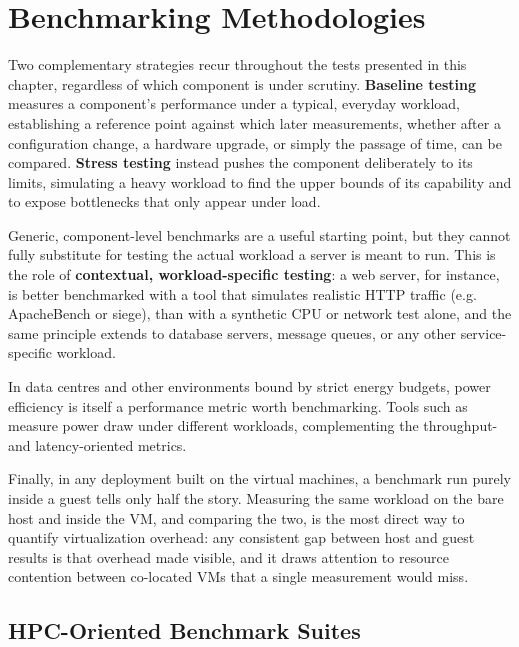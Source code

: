 \section{Benchmarking Methodologies} \label{sec:benchmark_methodology}

Two complementary strategies recur throughout the tests presented in this chapter, regardless of which component is under scrutiny. \textbf{Baseline testing} measures a component's performance under a typical, everyday workload, establishing a reference point against which later measurements, whether after a configuration change, a hardware upgrade, or simply the passage of time, can be compared. \textbf{Stress testing} instead pushes the component deliberately to its limits, simulating a heavy workload to find the upper bounds of its capability and to expose bottlenecks that only appear under load.

Generic, component-level benchmarks are a useful starting point, but they cannot fully substitute for testing the actual workload a server is meant to run. This is the role of \textbf{contextual, workload-specific testing}: a web server, for instance, is better benchmarked with a tool that simulates realistic HTTP traffic (e.g. {\ttfamily\footnotesize ApacheBench} or {\ttfamily\footnotesize siege}), than with a synthetic CPU or network test alone, and the same principle extends to database servers, message queues, or any other service-specific workload.

\begin{observationblock}
In data centres and other environments bound by strict energy budgets, power efficiency is itself a performance metric worth benchmarking. Tools such as  measure power draw under different workloads, complementing the throughput- and latency-oriented metrics.
\end{observationblock}

Finally, in any deployment built on the virtual machines, a benchmark run purely inside a guest tells only half the story. Measuring the same workload on the bare host and inside the VM, and comparing the two, is the most direct way to quantify virtualization overhead: any consistent gap between host and guest results is that overhead made visible, and it draws attention to resource contention between co-located VMs that a single measurement would miss.

\subsection{HPC-Oriented Benchmark Suites} \label{sec:hpc_benchmarks}

